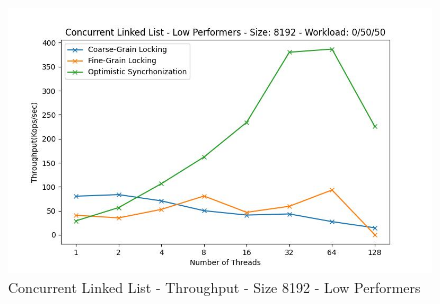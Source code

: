 \documentclass[../final_report.tex]{subfiles}
\begin{document}
\begin{figure}[H]
        \includegraphics[scale=0.4]{outFiles/plots/concurrent_data_structs_low_8192_0_50_50.jpg}
    \caption{Concurrent Linked List - Throughput - Size 8192 - Low Performers}
    \label{fig:Concurrent Linked List - Throughput - Size 8192 - Low Performers}
\end{figure}
\end{document}
